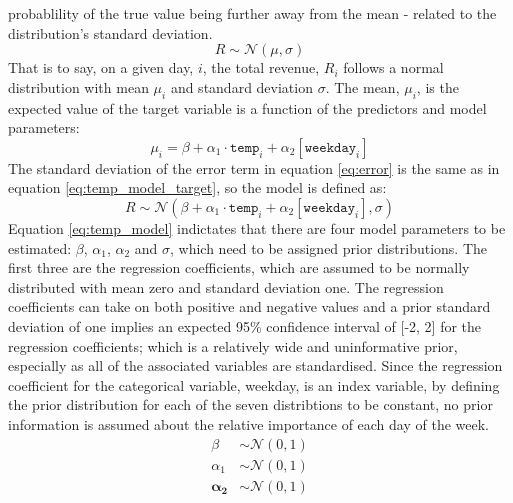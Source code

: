 probablility of the true value being further away from the mean - related to
the distribution's standard deviation.
\begin{equation}
  \label{eq:temp_model_target}
  R \sim \mathcal{N}(\mu, \sigma)
\end{equation}
That is to say, on a given day, $i$, the total revenue, $R_i$ follows a normal distribution 
with mean $\mu_i$ and standard deviation $\sigma$. The mean, $\mu_i$, is the
expected value of the target variable is a function of the predictors and model
parameters:
\begin{equation}
  \mu_i = \beta + \alpha_1 \cdot \texttt{temp}_i + \alpha_2[\texttt{weekday}_i]
\end{equation}
The standard deviation of the error term in equation \ref{eq:error} is 
the same as in equation \ref{eq:temp_model_target}, so the model is defined as: 
\begin{equation}
  \label{eq:temp_model}
  R \sim \mathcal{N}(\beta + \alpha_1 \cdot \texttt{temp}_i + \alpha_2[\texttt{weekday}_i], \sigma)
\end{equation}
Equation \ref{eq:temp_model} indictates that there are four model parameters to
be estimated: $\beta$, $\alpha_1$, $\alpha_2$ and $\sigma$, which need to be
assigned prior distributions. The first three are the regression coefficients,
which are assumed to be normally distributed with mean zero and standard
deviation one. The regression coefficients can take on both positive and
negative values and a prior standard deviation of one implies an expected 95\%
confidence interval of [-2, 2] for the regression coefficients; which is a
relatively wide and uninformative prior, especially as all of the associated
variables are standardised. Since the regression coefficient for the
categorical variable, weekday, is an index variable, by defining the prior
distribution for each of the seven distribtions to be constant, no prior
information is assumed about the relative importance of each day of the week.
\begin{equation}
  \label{eq:simple_temp_priors}
  \begin{split}
    \beta &\sim \mathcal{N}(0, 1) \\
    \alpha_1 &\sim \mathcal{N}(0, 1) \\
    \boldsymbol{\alpha_2} &\sim \mathcal{N}(0, 1) \\
  \end{split}
\end{equation}


